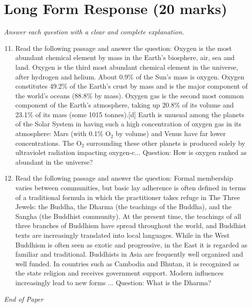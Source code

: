 \documentclass[12pt]{article}
\begin{document}
\section*{Long Form Response (20 marks)}
\textit{Answer each question with a clear and complete explanation.}
\begin{enumerate}[label=\arabic*.]
\setcounter{enumi}{10}
\item Read the following passage and answer the question: Oxygen is the most abundant chemical element by mass in the Earth's biosphere, air, sea and land. Oxygen is the third most abundant chemical element in the universe, after hydrogen and helium. About 0.9\% of the Sun's mass is oxygen. Oxygen constitutes 49.2\% of the Earth's crust by mass and is the major component of the world's oceans (88.8\% by mass). Oxygen gas is the second most common component of the Earth's atmosphere, taking up 20.8\% of its volume and 23.1\% of its mass (some 1015 tonnes).[d] Earth is unusual among the planets of the Solar System in having such a high concentration of oxygen gas in its atmosphere: Mars (with 0.1\% O$_{2}$ by volume) and Venus have far lower concentrations. The O$_{2}$ surrounding these other planets is produced solely by ultraviolet radiation impacting oxygen-c... Question: How is oxygen ranked as abundant in the universe?
\item Read the following passage and answer the question: Formal membership varies between communities, but basic lay adherence is often defined in terms of a traditional formula in which the practitioner takes refuge in The Three Jewels: the Buddha, the Dharma (the teachings of the Buddha), and the Sangha (the Buddhist community). At the present time, the teachings of all three branches of Buddhism have spread throughout the world, and Buddhist texts are increasingly translated into local languages. While in the West Buddhism is often seen as exotic and progressive, in the East it is regarded as familiar and traditional. Buddhists in Asia are frequently well organized and well funded. In countries such as Cambodia and Bhutan, it is recognized as the state religion and receives government support. Modern influences increasingly lead to new forms ... Question: What is the Dharma?
\end{enumerate}

\vfill
\noindent\textit{End of Paper}
\end{document}
